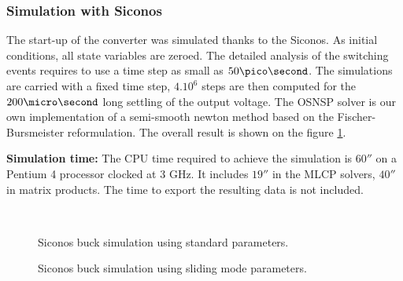 \subsubsection{Simulation with {\sc Siconos}}
 The start-up of the converter was simulated thanks to the {\sc Siconos}. As initial conditions, all state variables are zeroed.
The detailed analysis of the switching events requires to use a time step as
small as $50 \pico \second$. The simulations are carried with a fixed time step, $4.10^{6}$ steps are then computed for the $200 \micro \second$ long settling of the output voltage. The OSNSP solver is our own implementation of a semi-smooth newton method based on the Fischer-Bursmeister reformulation\cite{Deluca.ea1996}.
The overall result is shown on the figure \ref{fig:figSimuBuck}.  


{\bf Simulation time:} The CPU time required to achieve the simulation is $60 \second$ on a
Pentium 4 processor clocked at 3 GHz. It includes $19 \second$ in the MLCP solvers, $40 \second$ in
matrix products. The time to export the resulting data is not included.


\begin{figure}[!ht]
  \subfigure[$V_{load}$ ]{\label{fig:SICONOS_SIMU_BUCK_VLOAD}
        \resizebox{0.5\linewidth}{!}{}
  }\hspace{-2mm}
  \subfigure[$I_L$]  
  {\label{fig:SICONOS_SIMU_BUCK_IL} 
        \resizebox{0.5\linewidth}{!}{}
  } \\
  \hspace{-2mm}
 \caption{{\sc Siconos} buck simulation using standard parameters.}
\label{fig:figSimuBuck}
\end{figure}
\begin{figure}[!ht]
     \hspace{-2mm}
  \caption{{\sc Siconos} buck simulation using sliding mode parameters.}
\label{fig:figSimuBuck_Sliding}
\end{figure}


